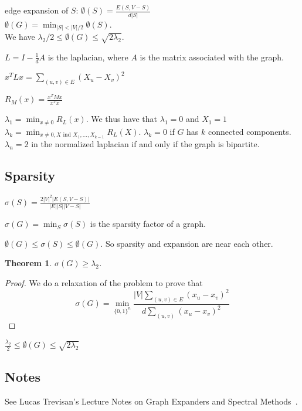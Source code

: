 \documentclass[12pt,a4paper]{article}
\newtheorem{theorem}{Theorem}
\begin{document}
edge expansion of $S$: $\emptyset(S) = \frac{E(S,V-S)}{d|S|}$\\
$\emptyset(G) = \min_{|S| < |V|/2}\emptyset(S)$.\\
We have $\lambda_2/2 \leq \emptyset(G) \leq \sqrt{2 \lambda_2}$.


$L = I - \frac{1}{d}A$ is the laplacian, where $A$ is the matrix associated with
the graph.

$x^TLx = \sum_{(u,v) \in E}(X_u - X_v)^2$

$R_M(x) = \frac{x^TMx}{x^Tx}$

$\lambda_1 = \min_{x \neq 0} R_L(x)$. We thus have that $\lambda_1 = 0$ and $X_1
= 1$\\

$\lambda_k = \min_{x \neq 0, X \text{ ind } X_1, \dots, X_{k-1}}R_L(X)$.
$\lambda_k = 0$ if $G$ has $k$ connected components.\\

$\lambda_n = 2$ in the normalized laplacian if and only if the graph is
bipartite.\\

\subsection{Sparsity}

$\sigma(S) = \frac{2|V|^2 |E(S,V-S)|}{|E||S||V-S|}$

$\sigma(G) = \min_S \sigma(S)$ is the sparsity factor of a graph.

$\emptyset(G) \leq \sigma(S) \leq \emptyset(G)$. So sparsity and expansion are
near each other.\\

\begin{theorem}{}{}
  $\sigma(G) \geq \lambda_2$.
\end{theorem}
\begin{proof}
  We do a relaxation of the problem to prove that
  \[\sigma(G) = \min_{\{0,1\}^n} \frac{|V|\sum_{(u,v) \in E}(x_u - x_v)^2}{d
      \sum_{(u,v)}(x_u-x_v)^2}\]
\end{proof}

$\frac{\lambda_2}{2} \leq \emptyset(G) \leq \sqrt{2 \lambda_2}$

\subsection{Notes}

See Lucas Trevisan's Lecture Notes on Graph Expanders and Spectral
Methods~\cite{TREVISAN16}.

\printbibliography[heading=bibintoc]
\nocite{*}
\end{document}
